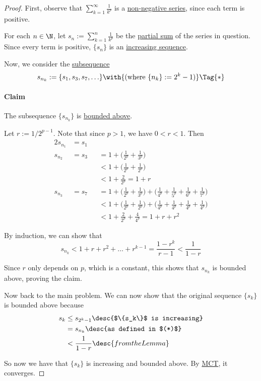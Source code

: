 \begin{proof}
  First, observe that $\displaystyle\sum_{k=1}^\infty\frac1{k^p}$ is a
  \href{b6cffeb}{non-negative series}, since each term is positive.

  For each $n\in\N$, let $s_n:=\displaystyle\sum_{k=1}^n\frac1{k^p}$ be the
  \href{a835138}{partial sum} of the series in question. Since every term is
  positive, $\{s_n\}$ is an \href{feae1b2}{increasing sequence}.

  Now, we consider the \href{c6b3a49}{subsequence}
  \begin{equation*}
    s_{n_k}:=\{s_1,s_3,s_7,\ldots\}\with{(\text{where }\{n_k\}:=2^k-1)}\Tag{*}
  \end{equation*}

  \paragraph{Claim} The subsequence $\{s_{n_k}\}$ is \href{d5ed299}{bounded above}.

  Let $r:=1/2^{p-1}$. Note that since $p>1$, we have $0<r<1$. Then
  \begin{alignat*}{2}
    s_{n_1} & =s_1                                                                                                             \\
    s_{n_2} & =s_3 &  & =1+\biggl(\frac1{2^p}+\frac1{3^p}\biggr)                                                               \\
            &      &  & <1+\biggl(\frac1{2^p}+\frac1{2^p}\biggr)                                                               \\
            &      &  & <1+\frac2{2^p}=1+r                                                                                     \\
    s_{n_3} & =s_7 &  & =1+\biggl(\frac1{2^p}+\frac1{3^p}\biggr)+\biggl(\frac1{4^p}+\frac1{5^p}+\frac1{6^p}+\frac1{7^p}\biggr) \\
            &      &  & <1+\biggl(\frac1{2^p}+\frac1{2^p}\biggr)+\biggl(\frac1{4^p}+\frac1{4^p}+\frac1{4^p}+\frac1{4^p}\biggr) \\
            &      &  & <1+\frac2{2^p}+\frac4{4^p}=1+r+r^2
  \end{alignat*}

  By induction, we can show that
  $$
    s_{n_k}<1+r+r^2+\ldots+r^{k-1}=\frac{1-r^k}{r-1}<\frac1{1-r}
  $$

  Since $r$ only depends on $p$, which is a constant, this shows that $s_{n_k}$
  is bounded above, proving the claim.

  Now back to the main problem. We can now show that the original sequence
  $\{s_k\}$ is bounded above because
  \begin{align*}
    s_k &\leq s_{2^k-1}\desc{$\{s_k\}$ is increasing} \\
        &=s_{n_k}\desc{as defined in $(*)$}           \\
        &<\frac1{1-r}\desc{from the Lemma}
  \end{align*}

  So now we have that $\{s_k\}$ is increasing and bounded above. By
  \href{c28d9a9}{MCT}, it converges.
\end{proof}

